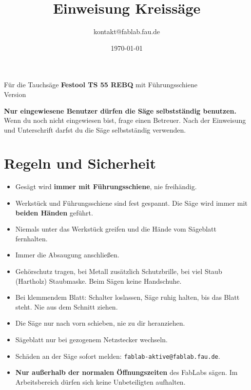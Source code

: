\documentclass{\basedir/fablab-document}
\date{\today}
\author{kontakt@fablab.fau.de}
\title{Einweisung Kreissäge}
\begin{document}
	\maketitle
	\begin{center}
		Für die Tauchsäge \textbf{Festool TS 55 REBQ} mit Führungsschiene\\[1mm]
		{\small Version \Version}
	\end{center}

	\textbf{Nur eingewiesene Benutzer dürfen die Säge selbstständig benutzen.}
	Wenn du noch nicht eingewiesen bist, frage einen Betreuer. Nach der Einweisung und Unterschrift darfst du die Säge selbstständig verwenden.

	\section{Regeln und Sicherheit}

	\begin{itemize}
		\item Gesägt wird \textbf{immer mit Führungsschiene}, nie freihändig.
		\item Werkstück und Führungsschiene sind fest gespannt. Die Säge wird immer mit \textbf{beiden Händen} geführt.
		\item Niemals unter das Werkstück greifen und die Hände vom Sägeblatt fernhalten.
		\item Immer die Absaugung anschließen.
		\item Gehörschutz tragen, bei Metall zusätzlich Schutzbrille, bei viel Staub (Hartholz) Staubmaske. Beim Sägen keine Handschuhe.
		\item Bei klemmendem Blatt: Schalter loslassen, Säge ruhig halten, bis das Blatt steht. Nie aus dem Schnitt ziehen.
		\item Die Säge nur nach vorn schieben, nie zu dir heranziehen.
		\item Sägeblatt nur bei gezogenem Netzstecker wechseln.
		\item Schäden an der Säge sofort melden: \texttt{fablab-aktive@fablab.fau.de}.
		\item \textbf{Nur außerhalb der normalen Öffnungszeiten} des FabLabs sägen. Im Arbeitsbereich dürfen sich keine Unbeteiligten aufhalten.
	\end{itemize}

\end{document}
